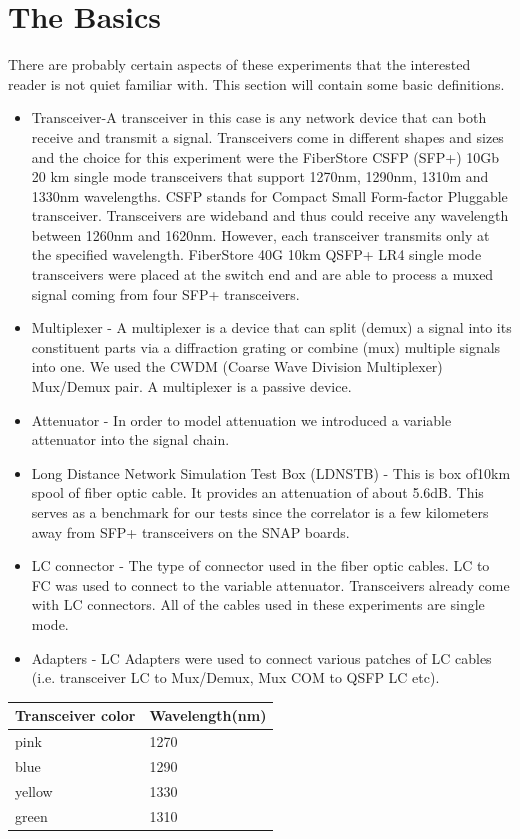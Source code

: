 \documentclass{article}
\begin{document}
\section*{The Basics}
There are probably certain aspects of these experiments that the interested reader is not quiet familiar with. This section will contain some basic definitions.
\begin{itemize}
\item Transceiver-A transceiver in this case is any network device that can both receive and transmit a signal. Transceivers come in different shapes and sizes and the choice for this experiment were the FiberStore CSFP (SFP+) 10Gb 20 km single mode transceivers that support 1270nm, 1290nm, 1310m and 1330nm wavelengths. CSFP stands for Compact Small Form-factor Pluggable transceiver. Transceivers are wideband and thus could receive any wavelength between 1260nm and 1620nm. However, each transceiver transmits only at the specified wavelength. FiberStore 40G 10km QSFP+ LR4 single mode transceivers were placed at the switch end and are able to process a muxed signal coming from four SFP+ transceivers.  
\item Multiplexer - A multiplexer is a device that can split (demux) a signal into its constituent parts via a diffraction grating or combine (mux) multiple signals into one. We used the CWDM (Coarse Wave Division Multiplexer) Mux/Demux pair. A multiplexer is a passive device. 
\item Attenuator - In order to model attenuation we introduced a variable attenuator into the signal chain. 
\item Long Distance Network Simulation Test Box (LDNSTB) - This is box of10km spool of fiber optic cable. It provides an attenuation of about 5.6dB. This serves as a benchmark for our tests since the correlator is a few kilometers away from SFP+ transceivers on the SNAP boards. 
\item LC connector - The type of connector used in the fiber optic cables. LC to FC was used to connect to the variable attenuator. Transceivers already come with LC connectors. All of the cables used in these experiments are single mode.  
\item Adapters - LC Adapters were used to connect various patches of LC cables (i.e. transceiver LC to Mux/Demux, Mux COM to QSFP LC etc). 
\end{itemize}

\begin{center}
\begin{tabular}{|l|p{2.5cm}|}
	\hline
	Transceiver color & Wavelength(nm)\\ \hline
	pink & 1270\\ \hline
	blue & 1290\\ \hline
	yellow & 1330\\ \hline
	green & 1310\\ \hline
\end{tabular}	
\end{center}
\end{document}
